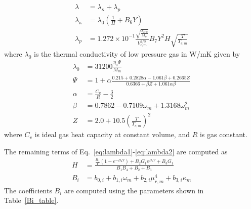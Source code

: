 \begin{align}
    \lambda &= \lambda_{\kappa} +\lambda_p \\
    \lambda_{\kappa} &= \lambda_0 \left( \frac{1}{H}+B_6 Y \right)  \label{eq:lambda1}\\
    \lambda_p &= 1.272\times 10^{-1}\frac{\sqrt{\frac{ T_{c,m}}{M_m}}}{V_{c,m}^{2/3}}B_7Y^2H \sqrt{\frac{T}{T_{c,m}}}\label{eq:lambda2}
\end{align}
where $\lambda_0$ is the thermal conductivity of low pressure gas in W/mK given by 
\begin{align}
    \lambda_0 &=31200 \frac{\eta_0\Psi}{M_m}\\
    \Psi &= 1 +\alpha\frac{0.215 + 0.2828\alpha-1.061\beta+0.2665Z }{0.6366 +\beta Z +1.061\alpha \beta }\\
    \alpha &= \frac{C_v}{R} -\frac{3}{2}\\
    \beta &= 0.7862 - 0.7109 \omega_m + 1.3168 \omega_m^2\\
    Z &= 2.0+10.5 \left(\frac{T}{T_{c,m}}\right)^2
\end{align}
where $C_v$ is ideal gas heat capacity at constant volume, and $R$ is gas constant.

The remaining terms of Eq.~\ref{eq:lambda1}-\ref{eq:lambda2} are computed as
\begin{align}
    H &= \frac{\frac{B_1}{Y}\left(1-e^{-B_4Y}\right) +B_2G_1 e^{B_5Y}+B_3 G_1}{B_1B_4 +B_2 +B_3}\\
    B_{i} &= b_{0,i} + b_{1,i}\omega_m + b_{2,i} \mu_{r,m}^4 + b_{3,i} \kappa_m
\end{align}
The coefficients $B_i$ are computed using the parameters shown in Table~\ref{Bi_table}.


